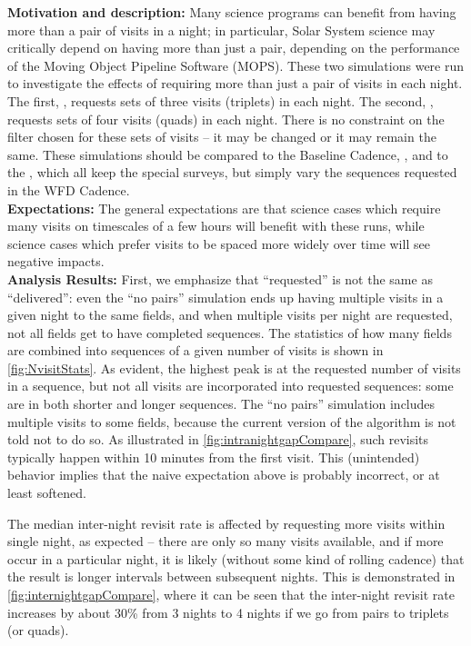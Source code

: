 {\bf Motivation and description:} Many science programs can benefit
from having more than a pair of visits in a night; in particular,
Solar System science may critically depend on having more than just a
pair, depending on the performance of the Moving Object Pipeline
Software (MOPS). These two simulations were run to investigate the
effects of requiring more than just a pair of visits in each
night. The first, , requests
sets of three visits (triplets) in each night. The second,
, requests sets of four visits (quads)
in each night. There is no constraint on the filter chosen for these
sets of visits -- it may be changed or it may remain the same. These
simulations should be compared to the Baseline Cadence,
, and to the ,
which all keep the special surveys, but simply vary the sequences
requested in the WFD Cadence. \\

{\bf Expectations:} The general expectations are that science cases
which require many visits on timescales of a few hours will benefit
with these runs, while science cases which prefer visits to be spaced
more widely over time will see negative impacts.\\

{\bf Analysis Results:}
First, we emphasize that ``requested'' is not the same as
``delivered'': even the ``no pairs''
simulation  ends
up having multiple visits in a given night to the same fields, and
when multiple visits per night are requested, not all fields get to
have completed sequences. The statistics of how many fields are
combined into sequences of a given number of visits is shown in
\autoref{fig:NvisitStats}.  As evident, the highest peak is at the
requested number of visits in a sequence, but not all visits are
incorporated into requested sequences: some are in both shorter and
longer sequences. The ``no pairs'' simulation includes
multiple visits to some fields, because the current
version of the algorithm is not told not to do so. As illustrated in
\autoref{fig:intranightgapCompare}, such revisits typically happen
within 10 minutes from the first visit. This (unintended) behavior
implies that the naive expectation above is probably incorrect, or at
least softened.

The median inter-night revisit rate is affected by requesting more
visits within single night, as expected -- there are only so many
visits available, and if more occur in a particular night, it is
likely (without some kind of rolling cadence) that the result is
longer intervals between subsequent nights. This is demonstrated in
\autoref{fig:internightgapCompare}, where it can be seen that the
inter-night revisit rate increases by about 30\% from 3 nights to 4
nights if we go from pairs to triplets (or quads).

